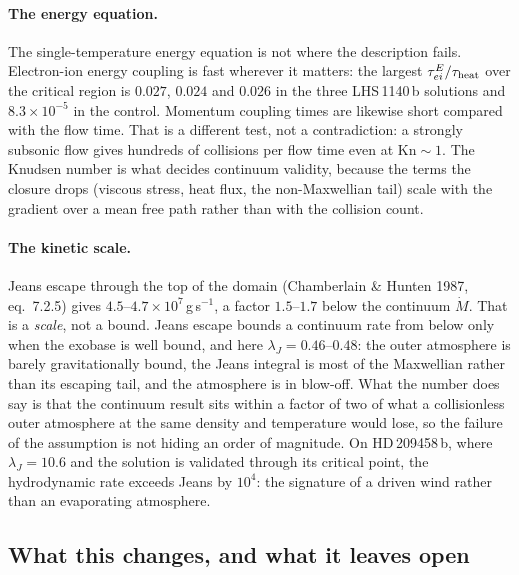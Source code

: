 \documentclass[english,a4paper]{my_memo}
\begin{document}
\paragraph{The energy equation.} The single-temperature energy equation is
not where the description fails. Electron-ion energy coupling is fast
wherever it matters: the largest $\tau^E_{ei}/\tau_{\rm heat}$ over the
critical region is $0.027$, $0.024$ and $0.026$ in the three LHS\,1140\,b
solutions and $8.3\times10^{-5}$ in the control. Momentum coupling times are
likewise short compared with the flow time. That is a different test, not a
contradiction: a strongly subsonic flow gives hundreds of collisions per flow
time even at $\mathrm{Kn}\sim 1$. The Knudsen number is what decides
continuum validity, because the terms the closure drops (viscous stress, heat
flux, the non-Maxwellian tail) scale with the gradient over a mean free path
rather than with the collision count.

\paragraph{The kinetic scale.} Jeans escape through the top of the domain
(Chamberlain \& Hunten 1987, eq.~7.2.5) gives
$4.5$--$4.7\times10^{7}$\,g\,s$^{-1}$, a factor $1.5$--$1.7$ below the
continuum $\dot M$. That is a \emph{scale}, not a bound. Jeans escape bounds
a continuum rate from below only when the exobase is well bound, and here
$\lambda_J = 0.46$--$0.48$: the outer atmosphere is barely gravitationally
bound, the Jeans integral is most of the Maxwellian rather than its escaping
tail, and the atmosphere is in blow-off. What the number does say is that the
continuum result sits within a factor of two of what a collisionless outer
atmosphere at the same density and temperature would lose, so the failure of
the assumption is not hiding an order of magnitude. On HD\,209458\,b, where
$\lambda_J = 10.6$ and the solution is validated through its critical point,
the hydrodynamic rate exceeds Jeans by $10^{4}$: the signature of a driven
wind rather than an evaporating atmosphere.

\subsection{What this changes, and what it leaves open}
\end{document}
